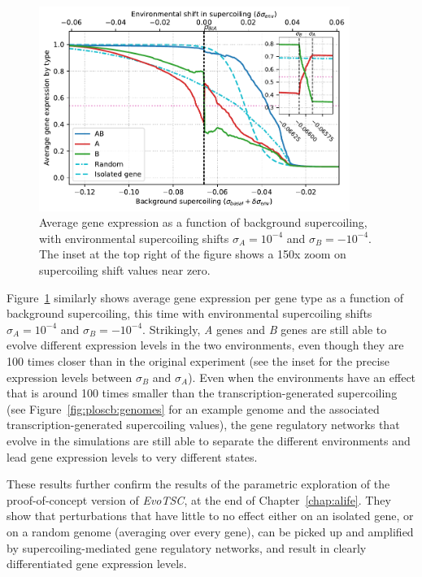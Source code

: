 \begin{figure}[H]
\centering
\includegraphics[width=0.9\textwidth]{param/sigma/sigma-1e-4/activity_sigmas_avg.pdf}
\caption[Average gene expression as a function of background supercoiling, with an absolute environmental supercoiling shift of 0.0001]{Average gene expression as a function of background supercoiling, with environmental supercoiling shifts $\sigma_A = 10^{-4}$ and $\sigma_B = -10^{-4}$.
The inset at the top right of the figure shows a 150x zoom on supercoiling shift values near zero.}
\label{fig:param:sigma-1e-4-activ-by-sigma}
\end{figure}

Figure~\ref{fig:param:sigma-1e-4-activ-by-sigma} similarly shows average gene expression per gene type as a function of background supercoiling, this time with environmental supercoiling shifts $\sigma_A = 10^{-4}$ and $\sigma_B = -10^{-4}$.
Strikingly, \emph{A} genes and \emph{B} genes are still able to evolve different expression levels in the two environments, even though they are 100 times closer than in the original experiment (see the inset for the precise expression levels between $\sigma_B$ and $\sigma_A$).
Even when the environments have an effect that is around 100 times smaller than the transcription-generated supercoiling (see Figure~\ref{fig:ploscb:genomes} for an example genome and the associated transcription-generated supercoiling values), the gene regulatory networks that evolve in the simulations are still able to separate the different environments and lead gene expression levels to very different states.

These results further confirm the results of the parametric exploration of the proof-of-concept version of \emph{EvoTSC}, at the end of Chapter~\ref{chap:alife}.
They show that perturbations that have little to no effect either on an isolated gene, or on a random genome (averaging over every gene), can be picked up and amplified by supercoiling-mediated gene regulatory networks, and result in clearly differentiated gene expression levels.


